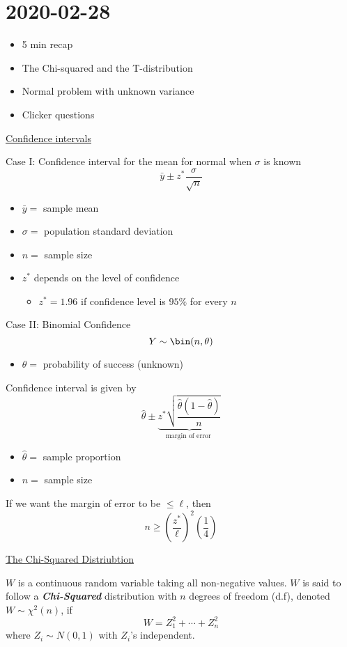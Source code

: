 \section{2020-02-28}
\begin{itemize}
    \item 5 min recap
    \item The Chi-squared and the T-distribution
    \item Normal problem with unknown variance
    \item Clicker questions
\end{itemize}
\underline{Confidence intervals}

Case I\@: Confidence interval for the mean for normal when $ \sigma $ is known
\[ \bar{y}\pm z^* \frac{\sigma}{\sqrt{n}}  \]
\begin{itemize}
    \item $ \bar{y}= $ sample mean
    \item $ \sigma= $ population standard deviation
    \item $ n= $ sample size
    \item $ z^* $ depends on the level of confidence
          \begin{itemize}
              \item $ z^*=1.96 $ if confidence level is $ 95\% $ for every $ n $
          \end{itemize}
\end{itemize}

Case II\@: Binomial Confidence
\[ Y \sim \bin(n,\theta) \]
\begin{itemize}
    \item $ \theta= $ probability of success (unknown)
\end{itemize}
Confidence interval is given by
\[ \hat{\theta}\pm \underbrace{z^* \sqrt{\frac{\hat{\theta}\left( 1-\hat{\theta} \right)}{n}}}_{\text{
            margin of error
        }} \]
\begin{itemize}
    \item $ \hat{\theta}= $ sample proportion
    \item $ n= $ sample size
\end{itemize}
If we want the margin of error to be $ \leqslant \ell $, then
\[ n\geqslant \left( \frac{z^*}{\ell} \right)^2\left( \frac{1}{4} \right) \]

\underline{The Chi-Squared Distriubtion}

\begin{Definition}{}{}
    $ W $ is a continuous random variable taking all non-negative values.
    $ W $ is said to follow a \textbf{\emph{Chi-Squared}} distribution
    with $ n $ degrees of freedom (d.f), denoted $ W \sim \chi^2(n) $,
    if
    \[ W=Z_1^2+\cdots+Z_n^2 \]
    where $ Z_i \sim N(0,1) $ with $ Z_i $'s independent.
\end{Definition}

